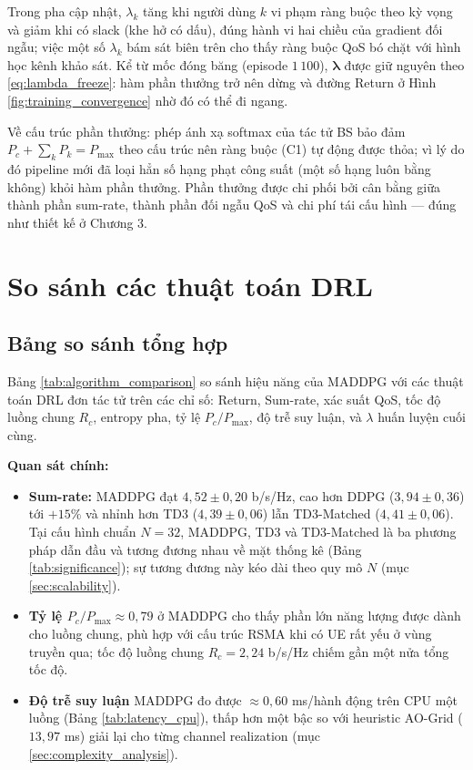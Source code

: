 Trong pha cập nhật, $\lambda_k$ tăng khi người dùng $k$ vi phạm ràng
buộc theo kỳ vọng và giảm khi có slack (khe hở có dấu), đúng hành vi
hai chiều của gradient đối ngẫu; việc một số $\lambda_k$ bám sát biên
trên cho thấy ràng buộc QoS bó chặt với hình học kênh khảo sát.
Kể từ mốc đóng băng (episode $1\,100$), $\boldsymbol{\lambda}$ được giữ
nguyên theo \eqref{eq:lambda_freeze}: hàm phần thưởng trở nên dừng và
đường Return ở Hình \ref{fig:training_convergence} nhờ đó có thể đi
ngang.

Về cấu trúc phần thưởng: phép ánh xạ softmax của tác tử BS bảo đảm
$P_c + \sum_k P_k = P_{\max}$ theo cấu trúc nên ràng buộc (C1) tự động
được thỏa; vì lý do đó pipeline mới đã loại hẳn số hạng phạt công suất
(một số hạng luôn bằng không) khỏi hàm phần thưởng. Phần thưởng được
chi phối bởi cân bằng giữa thành phần sum-rate, thành phần đối ngẫu
QoS và chi phí tái cấu hình --- đúng như thiết kế ở Chương 3.

\section{So sánh các thuật toán DRL}
\label{sec:algo_comp}

\subsection{Bảng so sánh tổng hợp}

Bảng \ref{tab:algorithm_comparison} so sánh hiệu năng của MADDPG với
các thuật toán DRL đơn tác tử trên các chỉ số: Return, Sum-rate, xác
suất QoS, tốc độ luồng chung $R_c$, entropy pha, tỷ lệ $P_c/P_{\max}$,
độ trễ suy luận, và $\lambda$ huấn luyện cuối cùng.



\textbf{Quan sát chính:}
\begin{itemize}[leftmargin=*]
\item \textbf{Sum-rate:} MADDPG đạt $4{,}52 \pm 0{,}20$ b/s/Hz, cao hơn
DDPG ($3{,}94 \pm 0{,}36$) tới $+15\%$ và nhỉnh hơn TD3
($4{,}39 \pm 0{,}06$) lẫn TD3-Matched ($4{,}41 \pm 0{,}06$). Tại cấu
hình chuẩn $N=32$, MADDPG, TD3 và TD3-Matched là ba phương pháp dẫn
đầu và tương đương nhau về mặt thống kê (Bảng \ref{tab:significance});
sự tương đương này kéo dài theo quy mô $N$ (mục \ref{sec:scalability}).
\item \textbf{Tỷ lệ $P_c/P_{\max} \approx 0{,}79$} ở MADDPG cho thấy
phần lớn năng lượng được dành cho luồng chung, phù hợp với cấu trúc
RSMA khi có UE rất yếu ở vùng truyền qua; tốc độ luồng chung
$R_c = 2{,}24$ b/s/Hz chiếm gần một nửa tổng tốc độ.
\item \textbf{Độ trễ suy luận} MADDPG đo được $\approx 0{,}60$ ms/hành
động trên CPU một luồng (Bảng \ref{tab:latency_cpu}), thấp hơn một bậc
so với heuristic AO-Grid ($13{,}97$ ms) giải lại cho từng channel
realization (mục \ref{sec:complexity_analysis}).
\end{itemize}

